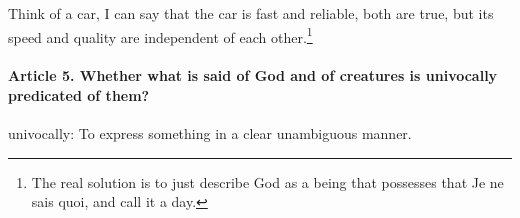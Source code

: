 \documentclass{ucetd}
\begin{document}
Think of a car, I can say that the car is fast and reliable, both are true, but its speed and quality are independent of each other.\footnote{The real solution is to just describe God as a being that possesses that Je ne sais quoi, and call it a day.}

\paragraph{Article 5. Whether what is said of God and of creatures is univocally predicated of them?}
\gls{univocally}: To express something in a clear unambiguous manner.
\end{document}
